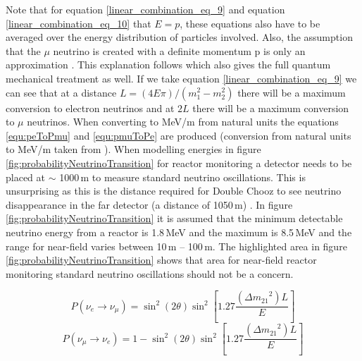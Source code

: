 Note that for equation \ref{linear_combination_eq_9} and equation \ref{linear_combination_eq_10} that $E = p$, these equations also have to be averaged over the energy distribution of particles involved. Also, the assumption that the $\mu$ neutrino is created with a definite momentum p is only an approximation \cite{sassaroli1999neutrino}. This explanation follows \cite{sassaroli1999neutrino} which also gives the full quantum mechanical treatment as well. If we take equation \ref{linear_combination_eq_9} we can see that at a distance $L = (4E\pi) / (m_1^2 - m_2^2)$ there will be a maximum conversion to electron neutrinos and at $2L$ there will be a maximum conversion to $\mu$ neutrinos. When converting to MeV/m from natural units the equations \ref{equ:peToPmu} and \ref{equ:pmuToPe} are produced (conversion from natural units to MeV/m taken from \cite{steveBoydLectureNotes}). When modelling energies in figure \ref{fig:probabilityNeutrinoTransition} for reactor monitoring a detector needs to be placed at $\sim$ 1000\,m to measure standard neutrino oscillations. This is unsurprising as this is the distance required for Double Chooz to see neutrino disappearance in the far detector (a distance of 1050\,m) \cite{lasserre2006} \cite{Abe_2012} \cite{abe2014improved}. In figure \ref{fig:probabilityNeutrinoTransition} it is assumed that the minimum detectable neutrino energy from a reactor is 1.8\,MeV and the maximum is 8.5\,MeV and the range for near-field varies between 10\,m -- 100\,m. The highlighted area in figure \ref{fig:probabilityNeutrinoTransition} shows that area for near-field reactor monitoring standard neutrino oscillations should not be a concern. 

\begin{equation}
    P(\nu_e \rightarrow \nu_\mu) = \sin^2(2\theta)\sin^2\left[1.27\frac{({\Delta m_{21}}^2)L}{E}\right]
    \label{equ:peToPmu}
\end{equation}
\begin{equation}
    P(\nu_\mu \rightarrow \nu_e) = 1 -  \sin^2(2\theta)\sin^2\left[1.27\frac{({\Delta m_{21}}^2)L}{E}\right]
    \label{equ:pmuToPe}
\end{equation}

